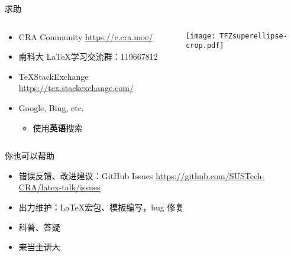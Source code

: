 \begin{frame}{求助}
  \begin{columns}[c]
    \begin{column}{.45\textwidth}
      \begin{itemize}
        \item CRA Community \url{https://c.cra.moe/}
        \item 南科大 \LaTeX 学习交流群：119667812
        \item \TeX StackExchange \url{https://tex.stackexchange.com/}
        \item Google, Bing, etc.
          \begin{itemize}
            \item 使用\textbf{英语}搜索
          \end{itemize}
      \end{itemize}
    \end{column}
    \begin{column}{.45\textwidth}
      \texttt{[image: TFZsuperellipse-crop.pdf]}
    \end{column}
  \end{columns}
\end{frame}

\begin{frame}{你也可以帮助}
  \begin{itemize}
    \item 错误反馈、改进建议：GitHub Issues \url{https://github.com/SUSTech-CRA/latex-talk/issues}
    \item 出力维护：\LaTeX 宏包、模板编写，bug 修复
    \item 科普、答疑 
    \item \sout{来当主讲人}
  \end{itemize}
\end{frame}
